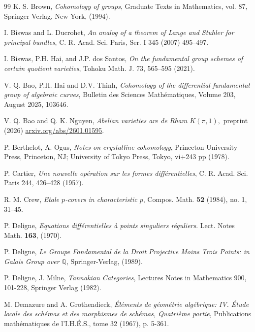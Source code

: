 \documentclass[12pt,a4]{amsart}
\theoremstyle{definition}
\begin{document}
\begin{thebibliography}{99}
 K. S. Brown, \textit{Cohomology of groups}, Graduate Texts in Mathematics, vol. 87, Springer-Verlag, New York, (1994).

 I. Biswas and L. Ducrohet,  \textit{An analog of a theorem of Lange and Stuhler for principal bundles}, C. R. Acad. Sci. Paris, Ser. I 345 (2007) 495--497.

 I. Biswas, P.H. Hai, and J.P. dos Santos,
\textit{On the fundamental group schemes of certain quotient varieties}, Tohoku Math. J.
73, 565--595  (2021).

 V. Q. Bao, P.H. Hai and D.V. Thinh, \textit{Cohomology of the differential fundamental group of algebraic curves},
Bulletin des Sciences Math\'ematiques, Volume 203, August 2025, 103646.

 V. Q. Bao and Q. K. Nguyen, \textit{Abelian varieties are de Rham $K(\pi,1),$} preprint (2026) \url{arxiv.org/abs/2601.01595}.

P. Berthelot, A. Ogus,  \textit{Notes on crystalline cohomology},
Princeton University Press, Princeton, NJ; University of Tokyo Press, Tokyo, vi+243 pp (1978).



 P. Cartier, \textit{Une nouvelle op\'eration sur les formes 
diff\'erentielles},
C. R. Acad. Sci. Paris 244, 426--428 (1957).

 R. M. Crew, \textit{Etale $p$-covers in characteristic
$p$}, Compos. Math. \textbf{52} (1984), no. 1, 31--45.


 P. Deligne, \textit{Equations diff\'erentielles \`a points singuliers 
r\'eguliers}. Lect. Notes Math. \textbf{163}, (1970).

 P. Deligne, \textit{Le Groupe Fondamental de la Droit Projective Moins Trois Points: in Galois Group over $\mathbb{Q}$}, Springer-Verlag, (1989).

   P. Deligne, J. Milne, \textit{ Tannakian Categories}, Lectures Notes in Mathematics 900, 101-228, Springer Verlag (1982). 

 M. Demazure and A. Grothendieck, 
\textit{\'El\'ements de g\'eom\'etrie alg\'ebrique: IV. \'Etude locale des sch\'emas et des
morphismes de sch\'emas, Quatri\`eme partie}, 
Publications math\'ematiques de l'I.H.\'E.S., 
tome 32 (1967), p. 5-361.


\end{thebibliography}
\end{document}
